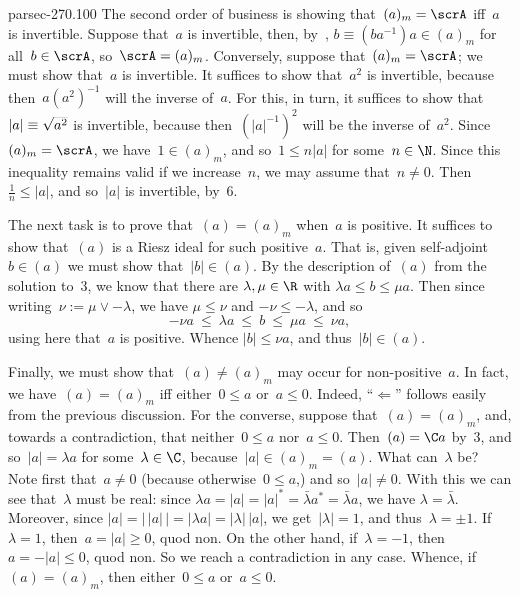 \documentclass[b5page]{book}
\begin{document}
\begin{solution}{parsec-270.100}
The second order of business
is showing that~$(a)_m=\scrA$ iff~$a$ is invertible.
Suppose that~$a$ is invertible,
then, by~,
$b\equiv (ba^{-1})a\in (a)_m$
for all~$b\in\scrA$, so~$\scrA=(a)_m$.
Conversely, suppose that~$(a)_m=\scrA$;
we must show that~$a$ is invertible.
It suffices to show that~$a^2$ is invertible,
because then~$a (a^2)^{-1}$ will the inverse of~$a$.
For this, in turn,
it suffices to show that~$\left|a\right|\equiv \smash{\sqrt{a^2}}$
is invertible,
because then~$(\left|a\right|^{-1})^2$
will be the inverse of~$a^2$.
Since~$(a)_m=\scrA$,
we have~$1\in(a)_m$,
and so~$1\leq n\left|a\right|$ for some~$n\in \N$.
Since this inequality remains valid if we increase~$n$,
we may assume that~$n\neq 0$.
Then~$\frac{1}{n} \leq \left|a\right|$,
and so~$\left|a\right|$ is invertible,
by~6.

The next task is to prove that~$(a)=(a)_m$ when~$a$ is positive.
It suffices to show that~$(a)$ is a Riesz ideal for such positive~$a$.
That is, given self-adjoint $b\in (a)$ we must show 
that~$\left|b\right|\in(a)$.
By the description of~$(a)$ 
from the solution to~3,
we know that there are $\lambda,\mu\in \R$ with
$\lambda a \leq b\leq \mu a$.
Then since writing~$\nu:= \mu\vee -\lambda$,
we have $\mu\leq \nu$ and $-\nu\leq -\lambda$,
and so
$$-\nu a \ \leq\  \lambda a \ \leq\  b\ \leq\  
\mu a\ \leq\  \nu a,$$ using here that~$a$ is positive.
Whence $\left|b\right|\leq \nu a$,
and thus~$\left|b\right| \in (a)$.

Finally,
we must show that~$(a)\neq (a)_m$ may occur for non-positive~$a$.
In fact,
we have~$(a)=(a)_m$ iff either~$0\leq a$ or~$a\leq 0$.
Indeed,
``$\Longleftarrow$'' follows easily from the previous discussion.
For the converse,
suppose that~$(a)=(a)_m$,
and, towards a contradiction,
that neither~$0\leq a$ nor~$a\leq 0$.
Then~$(a)=\C a$
by~3,
and so~$\left|a\right|=\lambda a$ for some~$\lambda\in \C$,
because~$\left|a\right| \in (a)_m=(a)$.
What can~$\lambda$ be?
Note first that~$a\neq 0$ (because otherwise~$0\leq a$,)
and so~$\left|a\right| \neq 0$.
With this we can see that~$\lambda$ must be real:
since
$\lambda a = \left|a\right| = \left|a\right|^* = \bar\lambda a^*
=\bar\lambda a$,
we have $\lambda=\bar\lambda$.
Moreover,
since $\left|a\right|=\left|\,\left|a\right|\,\right|
= \left|\lambda a\right| = \left| \lambda\right|\,\left|a \right|$,
we get~$\left|\lambda\right| = 1$,
and thus~$\lambda = \pm 1$.
If~$\lambda =1$,
then~$a = \left|a\right|\geq 0$, quod non.
On the other hand,
if~$\lambda=-1$,
then~$a=-\left|a\right|\leq 0$, quod non.
So we reach a contradiction in any case.
Whence, if~$(a)=(a)_m$,
then either~$0\leq a$ or~$a\leq 0$.
\end{solution}
\end{document}
